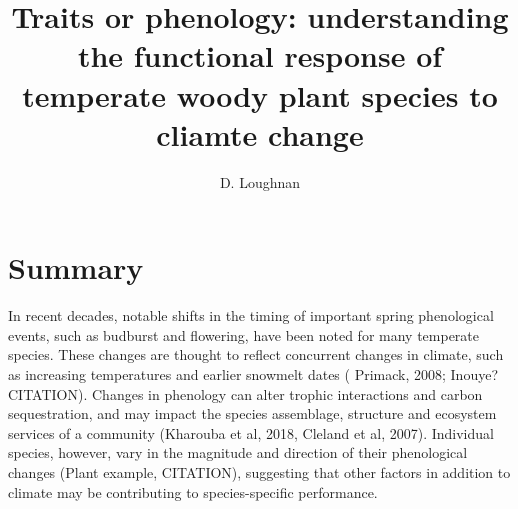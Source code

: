 \documentclass{article}\usepackage[]{graphicx}\usepackage[]{color}
\begin{document}

\title{Traits or phenology: understanding the functional response of temperate woody plant species to cliamte change} %

\author{D. Loughnan}
\maketitle  %


\section*{Summary}

\par In recent decades, notable shifts in the timing of important spring phenological events, such as budburst and flowering, have been noted for many temperate species. These changes are thought to reflect concurrent changes in climate, such as increasing temperatures and earlier snowmelt dates ( Primack, 2008; Inouye? CITATION). Changes in phenology can alter trophic interactions and carbon sequestration, and may impact the species assemblage, structure and ecosystem services of a community (Kharouba et al, 2018, Cleland et al, 2007). Individual species, however, vary in the magnitude and direction of their phenological changes (Plant example, CITATION), suggesting that other factors in addition to climate may be contributing to species-specific performance.
\end{document}

